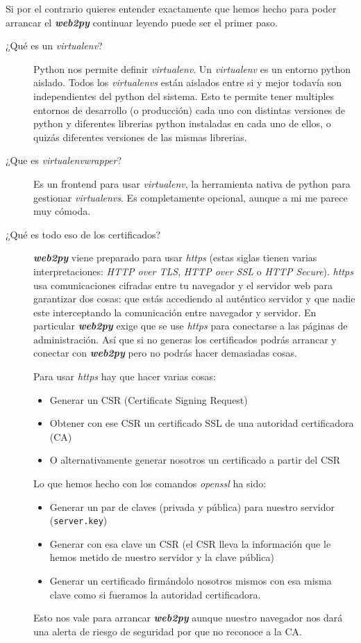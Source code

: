 \documentclass[
  12pt,
  spanish,
]{article}
\providecommand{\tightlist}{%
  \setlength{\itemsep}{0pt}\setlength{\parskip}{0pt}}
\begin{document}
Si por el contrario quieres entender exactamente que hemos hecho para
poder arrancar el \textbf{\emph{web2py}} continuar leyendo puede ser el
primer paso.

\begin{description}
\item[¿Qué es un \emph{virtualenv}?]
Python nos permite definir \emph{virtualenv}. Un \emph{virtualenv} es un
entorno python aislado. Todos los \emph{virtualenvs} están aislados
entre si y mejor todavía son independientes del python del sistema. Esto
te permite tener multiples entornos de desarrollo (o producción) cada
uno con distintas versiones de python y diferentes librerias python
instaladas en cada uno de ellos, o quizás diferentes versiones de las
mismas librerias.
\item[¿Que es \emph{virtualenvwrapper}?]
Es un frontend para usar \emph{virtualenv}, la herramienta nativa de
python para gestionar \emph{virtualenvs}. Es completamente opcional,
aunque a mi me parece muy cómoda.
\item[¿Qué es todo eso de los certificados?]
\textbf{\emph{web2py}} viene preparado para usar \emph{https} (estas
siglas tienen varias interpretaciones: \emph{HTTP over TLS}, \emph{HTTP
over SSL} o \emph{HTTP Secure}). \emph{https} usa comunicaciones
cifradas entre tu navegador y el servidor web para garantizar dos cosas:
que estás accediendo al auténtico servidor y que nadie este
interceptando la comunicación entre navegador y servidor. En particular
\textbf{\emph{web2py}} exige que se use \emph{https} para conectarse a
las páginas de administración. Así que si no generas los certificados
podrás arrancar y conectar con \textbf{\emph{web2py}} pero no podrás
hacer demasiadas cosas.

Para usar \emph{https} hay que hacer varias cosas:

\begin{itemize}
\tightlist
\item
  Generar un CSR (Certificate Signing Request)
\item
  Obtener con ese CSR un certificado SSL de una autoridad certificadora
  (CA)
\item
  O alternativamente generar nosotros un certificado a partir del CSR
\end{itemize}

Lo que hemos hecho con los comandos \emph{openssl} ha sido:

\begin{itemize}
\tightlist
\item
  Generar un par de claves (privada y pública) para nuestro servidor
  (\texttt{server.key})
\item
  Generar con esa clave un CSR (el CSR lleva la información que le hemos
  metido de nuestro servidor y la clave pública)
\item
  Generar un certificado firmándolo nosotros mismos con esa misma clave
  como si fueramos la autoridad certificadora.
\end{itemize}

Esto nos vale para arrancar \textbf{\emph{web2py}} aunque nuestro
navegador nos dará una alerta de riesgo de seguridad por que no reconoce
a la CA.
\end{description}
\end{document}
